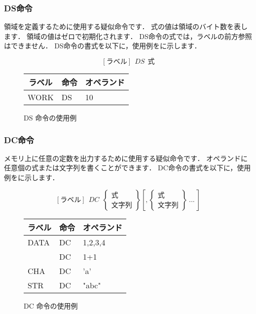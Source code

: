 \subsubsection{DS命令}
領域を定義するために使用する疑似命令です．
式の値は領域のバイト数を表します．
領域の値はゼロで初期化されます．
DS命令の式では，ラベルの前方参照はできません．
DS命令の書式を以下に，使用例をに示します．

{\small\[ [ラベル]~~DS~~式 \]}

\begin{figure}[btp]
\begin{center}
{\tt\small\begin{tabular}{|l|l|l|}\hline
\multicolumn{1}{|c|}{ラベル} & 
        \multicolumn{1}{c|}{命令} & \multicolumn{1}{c|}{オペランド} \\\hline
WORK & DS & 10 \\\hline
\end{tabular}}
\caption{DS 命令の使用例}
\label{fig:appB:ds}
\end{center}
\end{figure}

\subsubsection{DC命令}
メモリ上に任意の定数を出力するために使用する疑似命令です．
オペランドに任意個の式または文字列を書くことができます．
DC命令の書式を以下に，使用例をに示します．

{\small\[ %
[ラベル]~~DC~~\left\{
  \begin{array}{c}
   式 \\
   文字列
  \end{array}
 \right\}
[,\left\{
  \begin{array}{c}
   式 \\
   文字列
  \end{array}  
 \right\} ~ ... ~
]
\]}

\begin{figure}[btp]
\begin{center}
{\tt\small\begin{tabular}{|l|l|l|}\hline
\multicolumn{1}{|c|}{ラベル} & 
        \multicolumn{1}{c|}{命令} & \multicolumn{1}{c|}{オペランド} \\\hline
DATA & DC & 1,2,3,4 \\
     & DC & 1+1 \\
CHA  & DC & 'a' \\
STR  & DC & "abc" \\\hline
\end{tabular}}
\caption{DC 命令の使用例}
\label{fig:appB:dc}
\end{center}
\end{figure}

